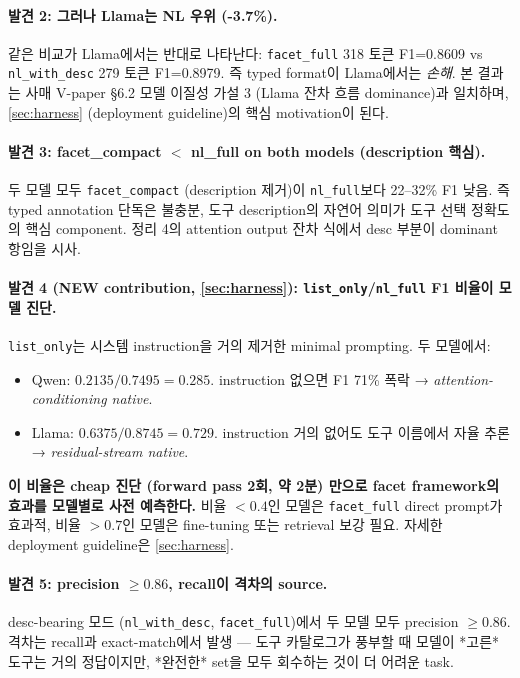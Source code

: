 \documentclass[11pt]{article}
\theoremstyle{plain}
\theoremstyle{definition}
\theoremstyle{remark}
\begin{document}
\paragraph{발견 2: 그러나 Llama는 NL 우위 (-3.7\%).}
같은 비교가 Llama에서는 반대로 나타난다: \texttt{facet\_full} 318 토큰 F1=0.8609 vs \texttt{nl\_with\_desc} 279 토큰 F1=0.8979. 즉 typed format이 Llama에서는 \emph{손해}. 본 결과는 사매 V-paper \citep{sibling2027prompt} §6.2 모델 이질성 가설 3 (Llama 잔차 흐름 dominance)과 일치하며, \cref{sec:harness} (deployment guideline)의 핵심 motivation이 된다.

\paragraph{발견 3: facet\_compact $<$ nl\_full on both models (description 핵심).}
두 모델 모두 \texttt{facet\_compact} (description 제거)이 \texttt{nl\_full}보다 22--32\% F1 낮음. 즉 typed annotation 단독은 불충분, 도구 description의 자연어 의미가 도구 선택 정확도의 핵심 component. 정리 4의 attention output 잔차 식에서 desc 부분이 dominant 항임을 시사.

\paragraph{발견 4 (NEW contribution, \cref{sec:harness}): \texttt{list\_only}/\texttt{nl\_full} F1 비율이 모델 진단.}
\texttt{list\_only}는 시스템 instruction을 거의 제거한 minimal prompting. 두 모델에서:
\begin{itemize}[leftmargin=*]
\item Qwen: $0.2135/0.7495 = \mathbf{0.285}$. instruction 없으면 F1 71\% 폭락 → \emph{attention-conditioning native}.
\item Llama: $0.6375/0.8745 = \mathbf{0.729}$. instruction 거의 없어도 도구 이름에서 자율 추론 → \emph{residual-stream native}.
\end{itemize}
\textbf{이 비율은 cheap 진단 (forward pass 2회, 약 2분) 만으로 facet framework의 효과를 모델별로 사전 예측한다.} 비율 $< 0.4$인 모델은 \texttt{facet\_full} direct prompt가 효과적, 비율 $> 0.7$인 모델은 fine-tuning 또는 retrieval 보강 필요. 자세한 deployment guideline은 \cref{sec:harness}.

\paragraph{발견 5: precision $\geq 0.86$, recall이 격차의 source.}
desc-bearing 모드 (\texttt{nl\_with\_desc}, \texttt{facet\_full})에서 두 모델 모두 precision $\geq 0.86$. 격차는 recall과 exact-match에서 발생 — 도구 카탈로그가 풍부할 때 모델이 *고른* 도구는 거의 정답이지만, *완전한* set을 모두 회수하는 것이 더 어려운 task.
\end{document}
